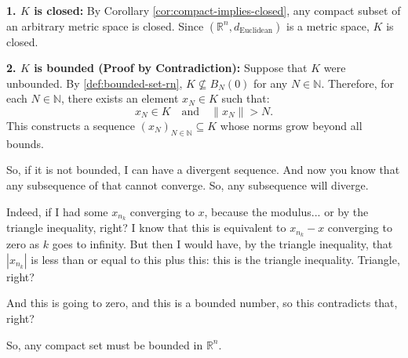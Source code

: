 \begin{proofWrapper}
\begin{content}
\textbf{1. $K$ is closed:}
By Corollary \ref{cor:compact-implies-closed}, any compact subset of an arbitrary metric space is closed. Since $(\mathbb{R}^n, d_{\text{Euclidean}})$ is a metric space, $K$ is closed.

\textbf{2. $K$ is bounded (Proof by Contradiction):}
Suppose that $K$ were unbounded.
By \cref{def:bounded-set-rn}, $K \not\subseteq B_N(0)$ for any $N \in \mathbb{N}$. Therefore, for each $N \in \mathbb{N}$, there exists an element $x_N \in K$ such that:
\begin{equation}\label{eq:unbounded-sequence-norm}
x_N \in K \quad \text{and} \quad \|x_N\| > N.
\end{equation}
This constructs a sequence $(x_N)_{N \in \mathbb{N}} \subseteq K$ whose norms grow beyond all bounds.
\end{content}

\begin{speech}[00:46:48 - 00:48:31]
So, if it is not bounded, I can have a divergent sequence. And now you know that any subsequence of that cannot converge. So, any subsequence will diverge. 

Indeed,  if I had some $x_{n_k}$ converging to $x$,  because the modulus... or by the triangle inequality, right? I know that this is equivalent to $x_{n_k} - x$ converging to zero  as $k$ goes to infinity.  But then I would have, by the triangle inequality, that $|x_{n_k}|$  is less than or equal to this plus this:  this is the triangle inequality. Triangle, right? 

And this is going to zero, and this is a bounded number, so this contradicts that, right? 

So, any compact set must be bounded in $\mathbb{R}^n$. 
\end{speech}

\begin{hidden}
\end{hidden}


\end{proofWrapper}

